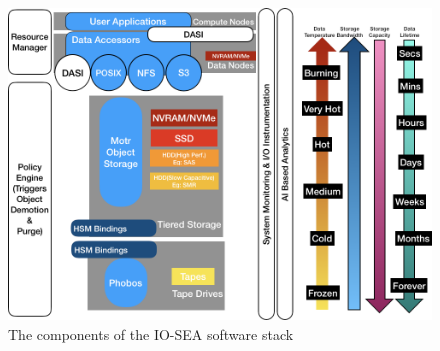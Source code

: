 \begin{figure}[ht]
    \centering
    \includegraphics[width=\textwidth]{FIGS/iosea-swstack.png}
    \caption[IO-SEA software stack]{ The components of the IO-SEA software stack}
    \label{fig:iosea-sw-stack}
\end{figure}